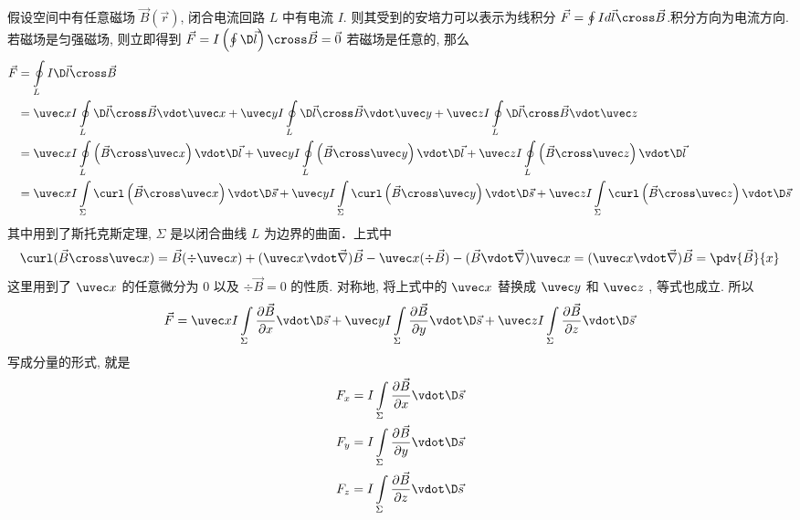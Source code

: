 

假设空间中有任意磁场 $\vec B\left( {\vec r} \right)$, 闭合电流回路 $L$ 中有电流 $I$. 则其受到的安培力可以表示为线积分 $\vec F = \oint{Id\vec l \cross \vec B} $.积分方向为电流方向.
若磁场是匀强磁场, 则立即得到 $\vec F = I\left( {\oint {\D \vec l} } \right) \cross \vec B = \vec 0$
若磁场是任意的, 那么
\begin{equation}
\begin{aligned}
\vec F &= \oint\limits_L {I\D \vec l \cross \vec B} \\
&= \uvec xI\oint\limits_L {\D \vec l \cross \vec B}  \vdot \uvec x + \uvec yI\oint\limits_L {\D \vec l \cross \vec B}  \vdot \uvec y + \uvec zI\oint\limits_L {\D \vec l \cross \vec B}  \vdot \uvec z\\
&= \uvec xI\oint\limits_L {\left( {\vec B \cross \uvec x} \right) \vdot \D \vec l}  + \uvec yI\oint\limits_L {\left( {\vec B \cross \uvec y} \right) \vdot \D \vec l}  + \uvec zI\oint\limits_L {\left( {\vec B \cross \uvec z} \right) \vdot \D \vec l} \\
&= \uvec xI\int\limits_\Sigma  {\curl \left( {\vec B \cross \uvec x} \right) \vdot \D \vec s}  + \uvec yI\int\limits_\Sigma  {\curl \left( {\vec B \cross \uvec y} \right) \vdot \D \vec s}  + \uvec zI\int\limits_\Sigma  {\curl \left( {\vec B \cross \uvec z} \right) \vdot \D \vec s} 
\end{aligned}
\end{equation}
其中用到了斯托克斯定理, $\Sigma $ 是以闭合曲线 $L$ 为边界的曲面．上式中
\begin{equation}
\curl (\vec B \cross \uvec x) = \vec B (\div \uvec x) + (\uvec x\vdot\vec\nabla )\vec B - \uvec x (\div \vec B) - (\vec B \vdot\vec\nabla)\uvec x = (\uvec x\vdot\vec\nabla)\vec B = \pdv{\vec B}{x}
\end{equation} 
这里用到了 $\uvec x$ 的任意微分为 0 以及 $\div \vec B = 0$ 的性质.
对称地, 将上式中的 $\uvec x$ 替换成 $\uvec y$ 和 $\uvec z$ , 等式也成立. 所以
\begin{equation}
\vec F = \uvec xI\int\limits_\Sigma  {\frac{{\partial \vec B}}{{\partial x}} \vdot \D \vec s}  + \uvec yI\int\limits_\Sigma  {\frac{{\partial \vec B}}{{\partial y}} \vdot \D \vec s}  + \uvec zI\int\limits_\Sigma  {\frac{{\partial \vec B}}{{\partial z}} \vdot \D \vec s} 
\end{equation} 
写成分量的形式, 就是
\begin{gather}
{F_x} = I\int\limits_\Sigma  {\dfrac{{\partial \vec B}}{{\partial x}} \vdot \D \vec s} \\
{F_y} = I\int\limits_\Sigma  {\dfrac{{\partial \vec B}}{{\partial y}} \vdot \D \vec s} \\
{F_z} = I\int\limits_\Sigma  {\dfrac{{\partial \vec B}}{{\partial z}} \vdot \D \vec s}
\end{gather} 








